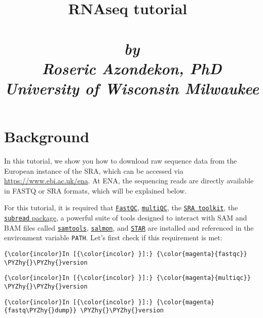 \documentclass[11pt]{article}
\title{RNAseq tutorial~\\~\\\small{\emph{by \\Roseric Azondekon, PhD\\University of Wisconsin Milwaukee}}}
\def\PYZhy{\char`\-}
\begin{document}
    
    
    \maketitle
    
    
    
    
    \hypertarget{background}{%
\section*{Background}\label{background}}
In this tutorial, we show you how to download raw sequence data from the
European instance of the SRA, which can be accessed via
\url{https://www.ebi.ac.uk/ena}. At ENA, the sequencing reads are directly
available in FASTQ or SRA formats, which will be explained below.

For this tutorial, it is required that  \href{https://www.bioinformatics.babraham.ac.uk/projects/fastqc/}{\texttt{FastQC}}, \href{https://multiqc.info/}{\texttt{multiQC}},                                                                                                                                                                                                                                                                                    the \href{https://www.ncbi.nlm.nih.gov/sra/docs/toolkitsoft/}{\texttt{SRA toolkit}}, the
\href{https://sourceforge.net/projects/subread/files/subread-1.6.4/}{\texttt{subread} package}, a powerful suite of tools designed to interact
with SAM and BAM files called \href{https://sourceforge.net/projects/samtools/files/}{\texttt{samtools}}, \href{https://combine-lab.github.io/salmon/}{\texttt{salmon}}, and \href{https://github.com/alexdobin/STAR}{\texttt{STAR}} are 
installed and referenced in the environment variable \texttt{PATH}.
Let's first check if this requirement is met:

    \begin{Verbatim}[commandchars=\\\{\}]
{\color{incolor}In [{\color{incolor} }]:} {\color{magenta}{fastqc}} \PYZhy{}\PYZhy{}version
\end{Verbatim}

    \begin{Verbatim}[commandchars=\\\{\}]
{\color{incolor}In [{\color{incolor} }]:} {\color{magenta}{multiqc}} \PYZhy{}\PYZhy{}version
\end{Verbatim}

    \begin{Verbatim}[commandchars=\\\{\}]
{\color{incolor}In [{\color{incolor} }]:} {\color{magenta}{fastq\PYZhy{}dump}} \PYZhy{}\PYZhy{}version
\end{Verbatim}
\end{document}
